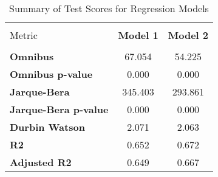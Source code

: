 
    \begin{table}
        \centering
        \caption{Summary of Test Scores for Regression Models}
        \vspace{10pt}
        \label{tab:test_scores}
        \begin{tabular}{lcc}
        \hline
        \hline \\[-1.8ex]
    Metric & \textbf{Model 1} & \textbf{Model 2} \\
\hline \\[-1.8ex] 
\textbf{Omnibus} & 67.054 & 54.225 \\
\textbf{Omnibus p-value} & 0.000 & 0.000 \\
\textbf{Jarque-Bera} & 345.403 & 293.861 \\
\textbf{Jarque-Bera p-value} & 0.000 & 0.000 \\
\textbf{Durbin Watson} & 2.071 & 2.063 \\
\textbf{R2} & 0.652 & 0.672 \\
\textbf{Adjusted R2} & 0.649 & 0.667 \\

        \hline
        \hline
        \end{tabular}
    \end{table}
    